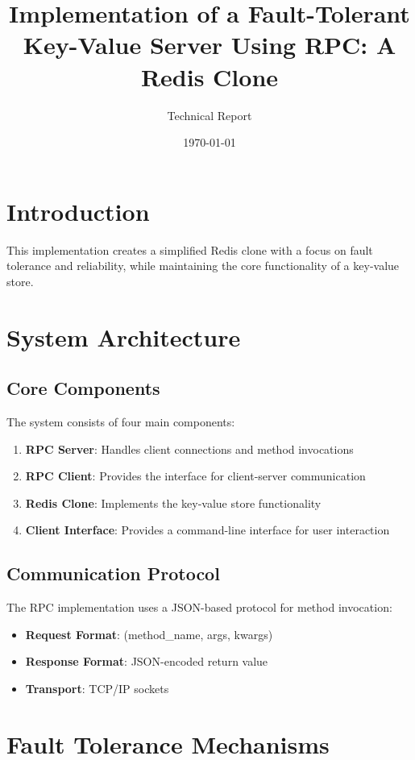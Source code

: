 \documentclass[11pt]{article}
\title{Implementation of a Fault-Tolerant Key-Value Server Using RPC: A Redis Clone}
\author{Technical Report}
\date{\today}
\begin{document}
\maketitle

\section{Introduction}
This implementation creates a simplified Redis clone with a focus on fault tolerance and reliability, while maintaining the core functionality of a key-value store.

\section{System Architecture}

\subsection{Core Components}
The system consists of four main components:
\begin{enumerate}
    \item \textbf{RPC Server}: Handles client connections and method invocations
    \item \textbf{RPC Client}: Provides the interface for client-server communication
    \item \textbf{Redis Clone}: Implements the key-value store functionality
    \item \textbf{Client Interface}: Provides a command-line interface for user interaction
\end{enumerate}

\subsection{Communication Protocol}
The RPC implementation uses a JSON-based protocol for method invocation:
\begin{itemize}
    \item \textbf{Request Format}: (method\_name, args, kwargs)
    \item \textbf{Response Format}: JSON-encoded return value
    \item \textbf{Transport}: TCP/IP sockets
\end{itemize}

\section{Fault Tolerance Mechanisms}
\end{document}
